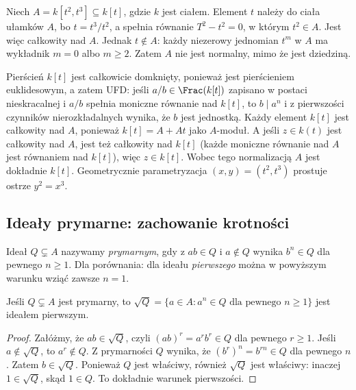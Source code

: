 \begin{przyklad}
\label{prz:normalizacja-ostrza}
Niech $A=k[t^2,t^3]\subseteq k[t]$, gdzie $k$ jest ciałem.
Element $t$ należy do ciała ułamków $A$, bo
$t=t^3/t^2$, a spełnia równanie $T^2-t^2=0$,
w którym $t^2\in A$. Jest więc całkowity nad $A$.
Jednak $t\notin A$: każdy niezerowy jednomian $t^m$
w $A$ ma wykładnik $m=0$ albo $m\ge2$.
Zatem $A$ nie jest normalny, mimo że jest dziedziną.

Pierścień $k[t]$ jest całkowicie domknięty, ponieważ
jest pierścieniem euklidesowym, a zatem UFD: jeśli
$a/b\in\Frac(k[t])$ zapisano w postaci nieskracalnej
i $a/b$ spełnia moniczne równanie nad $k[t]$, to
$b\mid a^n$ i z pierwszości czynników nierozkładalnych
wynika, że $b$ jest jednostką. Każdy element $k[t]$
jest całkowity nad $A$, ponieważ
$k[t]=A+At$ jako $A$-moduł. A jeśli $z\in k(t)$
jest całkowity nad $A$, jest też całkowity nad $k[t]$
(każde moniczne równanie nad $A$ jest równaniem nad
$k[t]$), więc $z\in k[t]$. Wobec tego normalizacją
$A$ jest dokładnie $k[t]$.
Geometrycznie parametryzacja $(x,y)=(t^2,t^3)$
prostuje ostrze $y^2=x^3$.
\end{przyklad}

\subsection{Ideały prymarne: zachowanie krotności}
\begin{definicja}
Ideał $Q\subsetneq A$ nazywamy \emph{prymarnym},
gdy z $ab\in Q$ i $a\notin Q$ wynika
$b^n\in Q$ dla pewnego $n\ge1$.
Dla porównania: dla ideału \emph{pierwszego} można
w powyższym warunku wziąć zawsze $n=1$.
\end{definicja}

\begin{stwierdzenie}
Jeśli $Q\subsetneq A$ jest prymarny, to
$\sqrt Q=\{a\in A:a^n\in Q\text{ dla pewnego }n\ge1\}$
jest ideałem pierwszym.
\end{stwierdzenie}
\begin{proof}
Załóżmy, że $ab\in\sqrt Q$, czyli
$(ab)^r=a^rb^r\in Q$ dla pewnego $r\ge1$.
Jeśli $a\notin\sqrt Q$, to $a^r\notin Q$.
Z prymarności $Q$ wynika, że
$(b^r)^n=b^{rn}\in Q$ dla pewnego $n$.
Zatem $b\in\sqrt Q$. Ponieważ $Q$ jest właściwy,
również $\sqrt Q$ jest właściwy: inaczej
$1\in\sqrt Q$, skąd $1\in Q$. To dokładnie
warunek pierwszości.
\end{proof}

